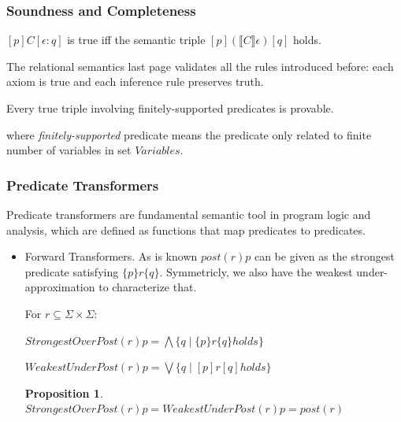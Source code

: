 \documentclass[11pt]{beamer}
\newtheorem{proposition}{Proposition}
\begin{document}
\begin{frame}\frametitle{Soundness and Completeness}
\begin{definition}
$[p]C[\epsilon: q]$ is true iff the semantic triple $[p](\llbracket C\rrbracket \epsilon)[q]$ holds.

\end{definition}


\begin{theorem}[Soundness]
The relational semantics last page validates all the rules introduced before: each axiom is true and each inference rule preserves truth.

\end{theorem}
\begin{theorem}[Completeness]
Every true triple involving finitely-supported predicates is provable.

\end{theorem}
where \textit{finitely-supported} predicate means the predicate only related to finite number of variables in set $Variables$.
\end{frame}

\begin{frame}\frametitle{Predicate Transformers}
Predicate transformers are fundamental semantic tool in  program logic and analysis, which are defined as functions that map predicates to predicates.
\begin{itemize}

\item Forward Transformers. As is known $post(r)p$ can be given as the strongest predicate satisfying $\{p\}r\{q\}$. Symmetricly, we also have the weakest under-approximation to characterize that.
\begin{definition}
For $r\subseteq \Sigma \times \Sigma$:

$StrongestOverPost(r)p = \bigwedge \{q\mid \{p\}r\{q\} holds\}$


$WeakestUnderPost(r)p = \bigvee \{q\mid [p]r[q] holds\}$

\end{definition} 

\begin{proposition}
$StrongestOverPost(r)p = WeakestUnderPost(r)p = post(r)$

\end{proposition}
\end{itemize}

\end{frame}
\end{document}
